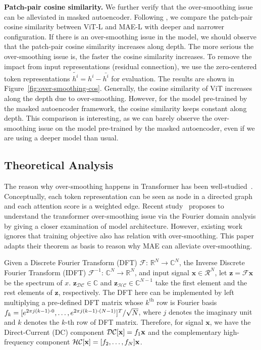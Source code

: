 \documentclass{article}
\theoremstyle{plain}
\theoremstyle{definition}
\theoremstyle{remark}
\begin{document}
\textbf{Patch-pair cosine similarity.} We further verify that the over-smoothing issue can be alleviated in masked autoencoder. Following \citet{gong2021vision}, we compare the patch-pair cosine similarity between ViT-L and MAE-L with deeper and narrower configuration. If there is an over-smoothing issue in the model, we should observe that the patch-pair cosine similarity increases along depth. The more serious the over-smoothing issue is, the faster the cosine similarity increases. To remove the impact from input representations (residual connection), we use the zero-centered token representations $\tilde{h^i}= h^i - \bar{h^i}$ for evaluation. The results are shown in Figure~\ref{fig:over-smoothing-cos}. Generally, the cosine similarity of ViT increases along the depth due to over-smoothing. However, for the model pre-trained by the masked autoencoder framework, the cosine similarity keeps constant along depth. This comparison is interesting, as we can barely observe the over-smoothing issue on the model pre-trained by the masked autoencoder, even if we are using a deeper model than usual. 











\subsection{Theoretical Analysis}\label{sec: theoretical reasoning}


The reason why over-smoothing happens in Transformer has been well-studied~\citep{dong2021attention, wang2022anti}. Conceptually, each token representation can be seen as node in a directed graph and each attention score is a weighted edge. Recent study~\citep{wang2022anti} proposes to understand the transformer over-smoothing issue via the Fourier domain analysis by giving a closer examination of model architecture. However, existing work ignores that training objective also has relation with over-smoothing. This paper adapts their theorem as basis to reason why MAE can alleviate over-smoothing.



Given a Discrete Fourier Transform (DFT) $\mathcal{F}$: $\mathbb{R}^N \to \mathbb{C}^N $, the Inverse Discrete Fourier Transform (IDFT) $\mathcal{F}^{-1}$: $\mathbb{C}^N \to \mathbb{R}^N  $, and input signal $\mathbf{x} \in \mathcal{R}^N$, let $\mathbf{z}=\mathcal{F}\mathbf{x}$ be the spectrum of $x$.
$\mathbf{z}_{\mathcal{DC}}\in\mathbb{C}$ and $\mathbf{z}_{\mathcal{HC}}\in\mathbb{C}^{N-1}$ take the first element and the rest elements of $\mathbf{z}$, respectively. 
The DFT here can be implemented by left multiplying a pre-defined DFT matrix whose $k^\mathrm{th}$ row is Fourier basis $\mathnormal{f}_k=[e^{2\pi j(k-1)\cdot0},\dots,e^{2\pi j(k-1)\cdot(N-1)}]^T/\sqrt{N}$, where $j$ denotes the imaginary unit and $k$ denotes the $k$-th row of DFT matrix. 
Therefore, for signal $\mathbf{x}$, we have the Direct-Current (DC) component $\mathcal{DC}[\mathbf{x}]=\mathnormal{f}_1\mathbf{x}$ and the complementary high-frequency component $\mathcal{HC}[\mathbf{x}]=[\mathnormal{f}_2,\dots,\mathnormal{f}_N]\mathbf{x}$.
\end{document}
